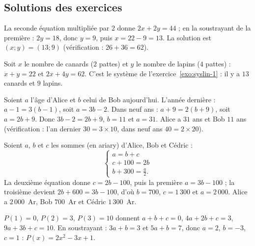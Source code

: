 \begin{corrige}
\section*{Solutions des exercices}
%
\begin{sol}
La seconde \'equation multipli\'ee par $2$ donne $2x + 2y = 44$ ; en la soustrayant de la premi\`ere : $2y = 18$, donc $y = 9$, puis $x = 22 - 9 = 13$.
La solution est $\boxed{(x ; y) = (13 ; 9)}$ (v\'erification : $26 + 36 = 62$).
\end{sol}
%
\begin{sol}
Soit $x$ le nombre de canards ($2$ pattes) et $y$ le nombre de lapins ($4$ pattes) : $x + y = 22$ et $2x + 4y = 62$.
C'est le syst\`eme de l'exercice~\ref{exo:syslin-1} : il y a $13$ canards et $9$ lapins.
\end{sol}
%
\begin{sol}
Soient $a$ l'\^age d'Alice et $b$ celui de Bob aujourd'hui.
L'ann\'ee derni\`ere : $a - 1 = 3(b - 1)$, soit $a = 3b - 2$. Dans neuf ans : $a + 9 = 2(b + 9)$, soit $a = 2b + 9$.
Donc $3b - 2 = 2b + 9$, $b = 11$ et $a = 31$. Alice a $31$ ans et Bob $11$ ans
(v\'erification : l'an dernier $30 = 3 \times 10$, dans neuf ans $40 = 2 \times 20$).
\end{sol}
%
\begin{sol}
Soient $a$, $b$ et $c$ les sommes (en ariary) d'Alice, Bob et C\'edric :
\[
\left\lbrace
\begin{array}{l}
a = b + c \\
c + 100 = 2b \\
b + 300 = \frac{a}{2} .
\end{array}
\right.
\]
La deuxi\`eme \'equation donne $c = 2b - 100$, puis la premi\`ere $a = 3b - 100$ ; la troisi\`eme devient
$2b + 600 = 3b - 100$, d'o\`u $b = 700$, $c = 1\,300$ et $a = 2\,000$.
Alice a $2\,000$~Ar, Bob $700$~Ar et C\'edric $1\,300$~Ar.
\end{sol}
%
\begin{sol}
$P(1) = 0$, $P(2) = 3$, $P(3) = 10$ donnent $a + b + c = 0$, $4a + 2b + c = 3$, $9a + 3b + c = 10$.
En soustrayant : $3a + b = 3$ et $5a + b = 7$, donc $a = 2$, $b = -3$, $c = 1$ : $\boxed{P(x) = 2x^2 - 3x + 1}$.


\end{sol}
\end{corrige}
